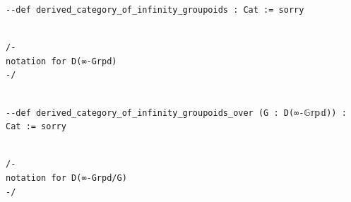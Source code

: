 \documentclass{book}
\theoremstyle{definition}
\newcounter{lcounter}
\begin{document}
{\begin{center}
\begin{tcolorbox}[width=5in,colback={white},title={\begin{center}\texttt{Lean \thelcounter} \addtocounter{lcounter}{1}  \end{center}},colbacktitle=Blue,coltitle=black]
\begin{verbatim}
--def derived_category_of_infinity_groupoids : Cat := sorry

\end{verbatim}
\end{tcolorbox}
\end{center}

\begin{center}
\begin{tcolorbox}[width=5in,colback={white},title={\begin{center}\texttt{Lean \thelcounter} \addtocounter{lcounter}{1}  \end{center}},colbacktitle=Blue,coltitle=black]
\begin{verbatim}

/-
notation for D(∞-Grpd) 
-/

\end{verbatim}
\end{tcolorbox}
\end{center}

\begin{center}
\begin{tcolorbox}[width=5in,colback={white},title={\begin{center}\texttt{Lean \thelcounter} \addtocounter{lcounter}{1}  \end{center}},colbacktitle=Blue,coltitle=black]
\begin{verbatim}

--def derived_category_of_infinity_groupoids_over (G : D(∞-𝔾𝕣𝕡𝕕)) : Cat := sorry

\end{verbatim}
\end{tcolorbox}
\end{center}

\begin{center}
\begin{tcolorbox}[width=5in,colback={white},title={\begin{center}\texttt{Lean \thelcounter} \addtocounter{lcounter}{1}  \end{center}},colbacktitle=Blue,coltitle=black]
\begin{verbatim}

/-
notation for D(∞-Grpd/G) 
-/

\end{verbatim}
\end{tcolorbox}
\end{center}



}
\end{document}
